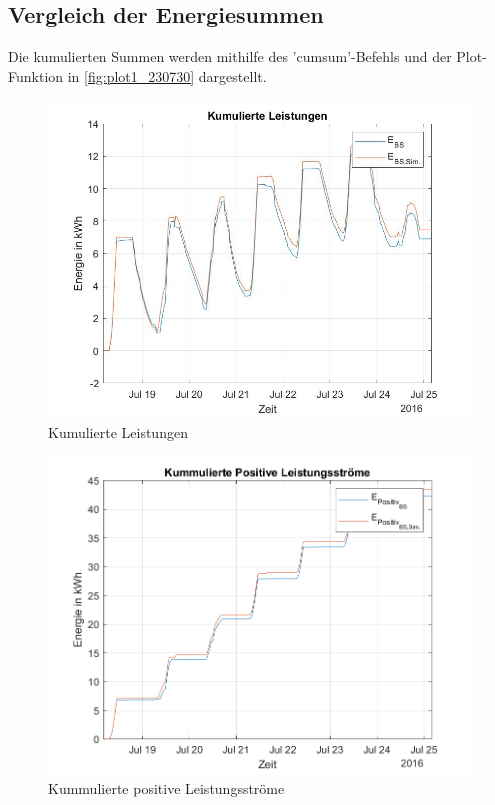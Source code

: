 \subsection{Vergleich der Energiesummen}
Die kumulierten Summen werden mithilfe des 'cumsum'-Befehls und der Plot-Funktion in \autoref{fig:plot1_230730} dargestellt.

\begin{figure}[H]
    \centering
    \includegraphics[width=\textwidth]{Abbildungen/kummulierteleistungen.jpg}
    \caption{Kumulierte Leistungen}
    \label{fig:plot1_230730}
\end{figure}

\begin{figure}[H]
    \centering
    \includegraphics[width=\textwidth]{Abbildungen/plot5.png}
    \caption{Kummulierte positive Leistungsströme}
    \label{fig:plot1_230730_2}
\end{figure}

